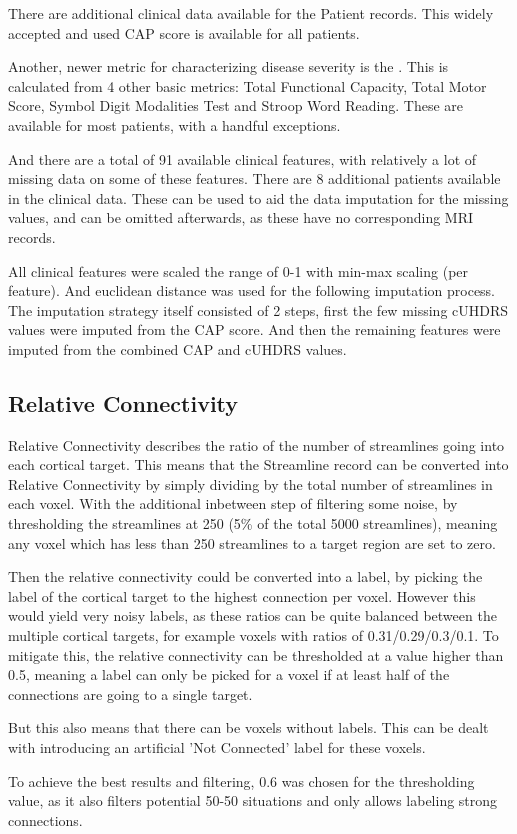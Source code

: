 There are additional clinical data available for the Patient records.  This widely accepted and used \ac{CAP} score is available for all patients.\par
Another, newer metric for characterizing disease severity is the . This is calculated from 4 other basic metrics: Total Functional Capacity, Total Motor Score, Symbol Digit Modalities Test and Stroop Word Reading. These are available for most patients, with a handful exceptions.\par
And there are a total of 91 available clinical features, with relatively a lot of missing data on some of these features. There are 8 additional patients available in the clinical data. These can be used to aid the data imputation for the missing values, and can be omitted afterwards, as these have no corresponding \ac{MRI} records.\par
All clinical features were scaled the range of 0-1 with min-max scaling (per feature). And euclidean distance was used for the following imputation process. The imputation strategy itself consisted of 2 steps, first the few missing \ac{cUHDRS} values were imputed from the \ac{CAP} score. And then the remaining features were imputed from the combined \ac{CAP} and \ac{cUHDRS} values.

\subsection{Relative Connectivity}
\label{sec:conpre}

Relative Connectivity describes the ratio of the number of streamlines going into each cortical target. This means that the Streamline record can be converted into Relative Connectivity by simply dividing by the total number of streamlines in each voxel. With the additional inbetween step of filtering some noise, by thresholding the streamlines at 250 (5\% of the total 5000 streamlines), meaning any voxel which has less than 250 streamlines to a target region are set to zero.\par
Then the relative connectivity could be converted into a label, by picking the label of the cortical target to the highest connection per voxel. However this would yield very noisy labels, as these ratios can be quite balanced between the multiple cortical targets, for example voxels with ratios of 0.31/0.29/0.3/0.1. To mitigate this, the relative connectivity can be thresholded at a value higher than 0.5, meaning a label can only be picked for a voxel if at least half of the connections are going to a single target.\par
But this also means that there can be voxels without labels. This can be dealt with introducing an artificial 'Not Connected' label for these voxels.\par
To achieve the best results and filtering, 0.6 was chosen for the thresholding value, as it also filters potential 50-50 situations and only allows labeling strong connections.


